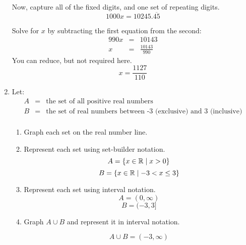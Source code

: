\documentclass[letterpaper,12pt,fleqn]{article}
\begin{document}
\begin{enumerate}
  Now, capture all of the fixed digits, and one set of repeating digits.
  \[1000x=10245.\overline{45}\]

  Solve for $x$ by subtracting the first equation from the second:
  \begin{eqnarray*}
    990x &=& 10143 \\
    x &=& \frac{10143}{990}
  \end{eqnarray*}
  You can reduce, but not required here.
  \[x=\frac{1127}{110}\]
  
\bigskip

\item Let:
\begin{eqnarray*}
A &=& \mbox{the set of all positive real numbers} \\
B &=& \mbox{the set of real numbers between -3 (exclusive) and 3 (inclusive)} \\
\end{eqnarray*}

\newcommand{\tick}[1]{\draw (#1,0.1) -- (#1,-0.1)}
\newcommand{\ocirc}[1]{\draw (#1,0) circle [radius=0.1]}
\newcommand{\ccirc}[1]{\draw [fill=black] (#1,0) circle [radius=0.1]}

\begin{enumerate}
\item Graph each set on the real number line.


  
\item Represent each set using set-builder notation.
\[A=\{x\in\mathbb{R}\mid x>0\}\]
\[B=\{x\in\mathbb{R}\mid -3<x\le3\}\]

\item Represent each set using interval notation.
\[A=(0,\infty)\]
\[B=(-3,3]\]

\item Graph $A\cup B$ and represent it in interval notation.

  \[A\cup B=(-3,\infty)\]
  

\end{enumerate}
\end{enumerate}
\end{document}
